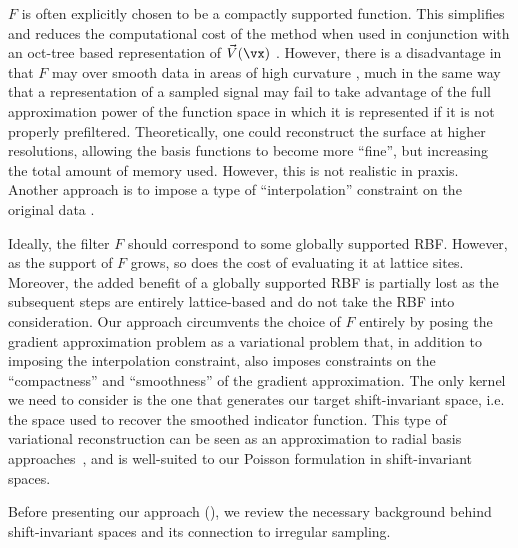 $F$ is often explicitly chosen to be a compactly supported function. This simplifies and reduces the computational cost of the method when used in conjunction with an oct-tree based representation of $\vec{V}(\vx)$ \cite{Kazhdan06}. However, there is a disadvantage in that $F$ may over smooth data in areas of high curvature \cite{reconbench}, much in the same way that a representation of a sampled signal may fail to take advantage of the full approximation power of the function space in which it is represented if it is not properly prefiltered. Theoretically, one could reconstruct the surface at higher resolutions, allowing the basis functions to become more ``fine'', but increasing the total amount of memory used. However, this is not realistic in praxis. Another approach is to impose a type of ``interpolation'' constraint on the original data \cite{screenedk}.

Ideally, the filter $F$ should correspond to some globally supported RBF. However, as the support of $F$ grows, so does the cost of evaluating it at lattice sites. Moreover, the added benefit of a globally supported RBF is partially lost as the subsequent steps are entirely lattice-based and do not take the RBF into consideration. Our approach circumvents the choice of $F$ entirely by posing the gradient approximation problem as a variational problem that, in addition to imposing the interpolation constraint, also imposes constraints on the ``compactness'' and ``smoothness'' of the gradient approximation. The only kernel we need to consider is the one that generates our target shift-invariant space, i.e. the space used to recover the smoothed indicator function. This type of variational reconstruction can be seen as an approximation to radial basis approaches~\cite{variational}, and is well-suited to our Poisson formulation in shift-invariant spaces.

Before presenting our approach (), we review the necessary background behind shift-invariant spaces and its connection to irregular sampling.

